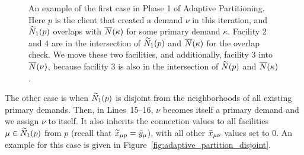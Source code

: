 \documentclass[oneside,final]{ucr}
\def\dsp{\def\baselinestretch{2.0}\large\normalsize}
\def\ssp{\def\baselinestretch{1.0}\large\normalsize}
\begin{document}
\begin{figure}[ht]
      \caption{An example of the first case in Phase 1 of
        Adaptive Partitioning. Here $p$ is the client that
        created a demand $\nu$ in this iteration, and
        ${\widetilde N}_1(p)$ overlaps with ${\overline{N}}(\kappa)$ for
        some primary demand $\kappa$. Facility $2$ and $4$
        are in the intersection of ${\widetilde N}_1(p)$ and
        ${\overline{N}}(\kappa)$ for the overlap check. We move
        these two facilities, and additionally, facility $3$
        into ${\overline{N}}(\nu)$, because facility $3$ is also in
        the intersection of ${\widetilde N}(p)$ and
        ${\overline{N}}(\kappa)$.}
  \label{fig:adaptive_partition_overlap}
\end{figure}
\dsp
The other case is when
${\widetilde N}_1(p)$ is disjoint from the neighborhoods of all
existing primary demands. Then, in Lines~15--16, $\nu$
becomes itself a primary demand and we assign $\nu$ to
itself. It also inherits the connection values to all
facilities $\mu\in{\widetilde N}_1(p)$ from $p$ (recall that
${\widetilde x}_{\mu p} = {\bar y}_{\mu}$), with all other
${\bar x}_{\mu\nu}$ values set to $0$. An example for this case
is given in Figure~\ref{fig:adaptive_partition_disjoint}.
\ssp
\end{document}
